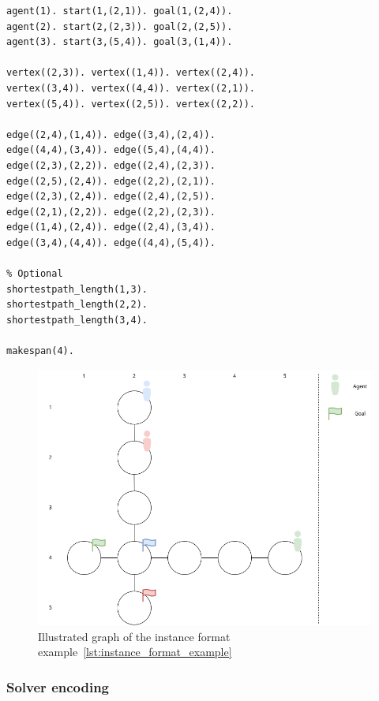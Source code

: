 \begin{minipage}[H]{\linewidth}
\begin{lstlisting}[style=mystyle, caption={Example of instance format}, label={lst:instance_format_example}]
agent(1). start(1,(2,1)). goal(1,(2,4)).
agent(2). start(2,(2,3)). goal(2,(2,5)).
agent(3). start(3,(5,4)). goal(3,(1,4)).

vertex((2,3)). vertex((1,4)). vertex((2,4)).
vertex((3,4)). vertex((4,4)). vertex((2,1)).
vertex((5,4)). vertex((2,5)). vertex((2,2)).

edge((2,4),(1,4)). edge((3,4),(2,4)).
edge((4,4),(3,4)). edge((5,4),(4,4)).
edge((2,3),(2,2)). edge((2,4),(2,3)).
edge((2,5),(2,4)). edge((2,2),(2,1)).
edge((2,3),(2,4)). edge((2,4),(2,5)).
edge((2,1),(2,2)). edge((2,2),(2,3)).
edge((1,4),(2,4)). edge((2,4),(3,4)).
edge((3,4),(4,4)). edge((4,4),(5,4)).

% Optional 
shortestpath_length(1,3).
shortestpath_length(2,2).
shortestpath_length(3,4).

makespan(4).
\end{lstlisting}
\end{minipage}


\begin{figure}[H]
    \centering
    \caption{Illustrated graph of the instance format example~\ref{lst:instance_format_example}}\label{fig:illustrated_instance_format_example}
    \includegraphics[width=\widthimg]{img/illustrated_instance_format_example.drawio.png}
\end{figure}


\subsubsection{Solver encoding}

